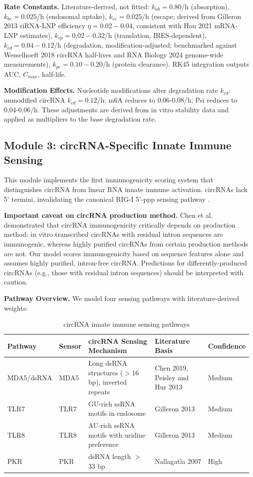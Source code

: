 \documentclass[11pt,a4paper]{article}
\begin{document}
\textbf{Rate Constants.} Literature-derived, not fitted: $k_{ab}=0.80$/h (absorption), $k_{be}=0.025$/h (endosomal uptake), $k_{ec}=0.025$/h (escape; derived from Gilleron 2013 siRNA-LNP efficiency $\eta = 0.02-0.04$, consistent with Hou 2021 mRNA-LNP estimates), $k_{cp}=0.02-0.32$/h (translation, IRES-dependent), $k_{cd}=0.04-0.12$/h (degradation, modification-adjusted; benchmarked against Wesselhoeft 2018 circRNA half-lives and RNA Biology 2024 genome-wide measurements), $k_{pc}=0.10-0.20$/h (protein clearance). RK45 integration outputs AUC, $C_{max}$, half-life.

\textbf{Modification Effects.} Nucleotide modifications alter degradation rate $k_{cd}$: unmodified circRNA $k_{cd} = 0.12$/h; m6A reduces to 0.06-0.08/h; Psi reduces to 0.04-0.06/h. These adjustments are derived from in vitro stability data and applied as multipliers to the base degradation rate.

\subsection{Module 3: circRNA-Specific Innate Immune Sensing}

This module implements the first immunogenicity scoring system that distinguishes circRNA from linear RNA innate immune activation. circRNAs lack 5' termini, invalidating the canonical RIG-I 5'-ppp sensing pathway \citep{hornung2006}.

\textbf{Important caveat on circRNA production method.} Chen et al. \citep{chen2019} demonstrated that circRNA immunogenicity critically depends on production method: in vitro transcribed circRNAs with residual intron sequences are immunogenic, whereas highly purified circRNAs from certain production methods are not. Our model scores immunogenicity based on sequence features alone and assumes highly purified, intron-free circRNA. Predictions for differently-produced circRNAs (e.g., those with residual intron sequences) should be interpreted with caution.

\textbf{Pathway Overview.} We model four sensing pathways with literature-derived weights:

\begin{table}[H]
\centering
\caption{circRNA innate immune sensing pathways}
\label{tab:immunogenicity_pathways}
\begin{tabular}{lllll}
\toprule
\textbf{Pathway} & \textbf{Sensor} & \textbf{circRNA Sensing Mechanism} & \textbf{Literature Basis} & \textbf{Confidence} \\
\midrule
MDA5/dsRNA & MDA5 & Long dsRNA structures ($>$16 bp), inverted repeats & Chen 2019, Peisley and Hur 2013 & Medium \\
TLR7 & TLR7 & GU-rich ssRNA motifs in endosome & Gilleron 2013 & Medium \\
TLR8 & TLR8 & AU-rich ssRNA motifs with uridine preference & Gilleron 2013 & Medium \\
PKR & PKR & dsRNA length $>$33 bp & Nallagatla 2007 & High \\
\bottomrule
\end{tabular}
\end{table}
\end{document}
